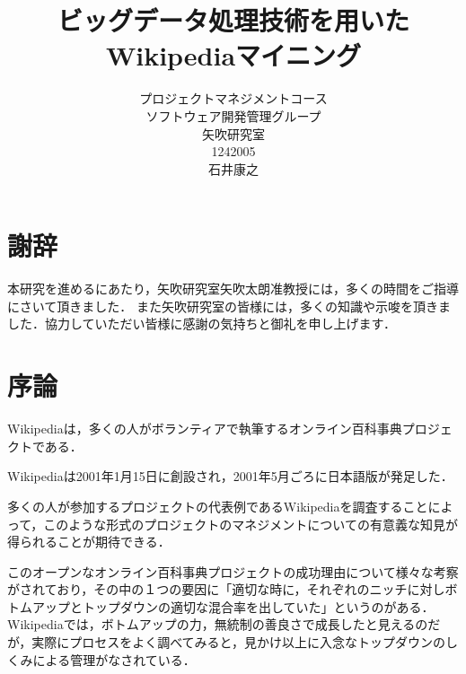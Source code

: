 \usepackage{here}

\title{ビッグデータ処理技術を用いた\\
Wikipediaマイニング}
\author{プロジェクトマネジメントコース\\
ソフトウェア開発管理グループ\\
矢吹研究室\\
1242005\\
石井康之}
\date{}

\maketitle



\chapter*{謝辞}

本研究を進めるにあたり，矢吹研究室矢吹太朗准教授には，多くの時間をご指導にさいて頂きました．
また矢吹研究室の皆様には，多くの知識や示唆を頂きました．協力していただい皆様に感謝の気持ちと御礼を申し上げます．

\tableofcontents%

\chapter{序論}

Wikipediaは，多くの人がボランティアで執筆するオンライン百科事典プロジェクトである．

Wikipediaは2001年1月15日に創設され，2001年5月ごろに日本語版が発足した．

多くの人が参加するプロジェクトの代表例であるWikipediaを調査することによって，このような形式のプロジェクトのマネジメントについての有意義な知見が得られることが期待できる．

このオープンなオンライン百科事典プロジェクトの成功理由について様々な考察がされており，その中の１つの要因に「適切な時に，それぞれのニッチに対しボトムアップとトップダウンの適切な混合率を出していた」というのがある\cite{bottom1}．
Wikipediaでは，ボトムアップの力，無統制の善良さで成長したと見えるのだが，実際にプロセスをよく調べてみると，見かけ以上に入念なトップダウンのしくみによる管理がなされている．

